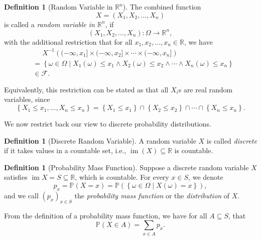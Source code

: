 \documentclass[11pt]{article}
\numberwithin{equation}{section}
\theoremstyle{definition}
\newtheorem{definition}[theorem]{Definition}
\theoremstyle{remark}
\newcommand{\pqty}[1]{\left(#1\right)}
\newcommand{\Bqty}[1]{\left\{#1\right\}}
\newcommand{\set}[2]{\left\{#1\mid #2\right\}}
\newcommand{\ocintv}[2]{(#1,#2]}
\newcommand{\functiondomain}[3]{#1:#2\to #3}
\newcommand{\RR}{\mathbb R}
\newcommand{\inverse}{^{-1}}
\newcommand{\eventSpace}{\mathcal F}
\newcommand{\Prob}{\mathbb P}
\DeclareMathOperator{\img}{im}
\begin{document}
\begin{definition}[Random Variable in \(\RR^n\)]\label{probability-definition-019}
    \label{probability-def:random-variable-rn}%
    The combined function
    \[
        X = \pqty{X_1, X_2, \ldots, X_n}
    \]
    is called a \emph{random variable in \(\RR^n\)}, if
    \[
        \functiondomain{\pqty{X_1, X_2, \ldots, X_n}}{\Omega}{\RR^n},
    \]
    with the additional restriction that for all \(x_1, x_2, \ldots, x_n \in \RR\), we have
    \begin{align*}
        &\phantom{=} X\inverse\pqty{\ocintv{-\infty}{x_1} \times \ocintv{-\infty}{x_2} \times \cdots \times \ocintv{-\infty}{x_n}} \\
        &= \set{\omega \in \Omega}{X_1 \pqty{\omega} \leq x_1 \land X_2 \pqty{\omega} \leq x_2 \land \cdots \land X_n \pqty{\omega} \leq x_n} \\
        &\in \eventSpace.
    \end{align*}

    Equivalently, this restriction can be stated as that all \(X_i\)s are real random variables, since
    \[
        \Bqty{X_1 \leq x_1, \ldots, X_n \leq x_n} = \Bqty{X_1 \leq x_1} \cap \Bqty{X_2 \leq x_2} \cap \cdots \cap \Bqty{X_n \leq x_n}.
    \]
\end{definition}

We now restrict back our view to discrete probability distributions.

\begin{definition}[Discrete Random Variable]\label{probability-definition-020}
    \label{probability-def:discrete-random-variable}%
    A random variable \(X\) is called \emph{discrete} if it takes values in a countable set, i.e., \(\img \pqty{X} \subseteq \RR\) is countable.
\end{definition}

\begin{definition}[Probability Mass Function]\label{probability-definition-021}
    \label{probability-def:probability-mass-function}%
    Suppose a discrete random variable \(X\) satisfies \(\img X = S \subseteq \RR\), which is countable. For every \(x \in S\), we denote
    \[
        p_x = \Prob\pqty{X = x} = \Prob\pqty{\set{\omega \in \Omega}{X\pqty{\omega} = x}},
    \]
    and we call \(\pqty{p_x}_{x \in S}\) the \emph{probability mass function} or the \emph{distribution} of \(X\).
\end{definition}

From the definition of a probability mass function, we have for all \(A \subseteq S\), that
\[
    \Prob\pqty{X \in A} = \sum_{x \in A} p_x.
\]
\end{document}
